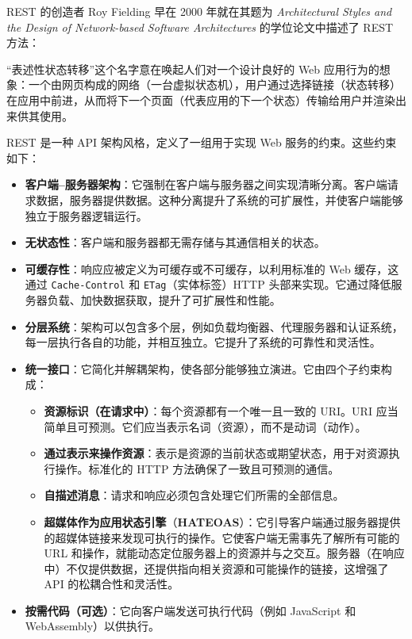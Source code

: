REST 的创造者 Roy Fielding 早在 2000 年就在其题为 \emph{Architectural Styles and the Design of Network-based Software Architectures} 的学位论文中描述了 REST 方法：

\begin{myQuote}
“表述性状态转移”这个名字意在唤起人们对一个设计良好的 Web 应用行为的想象：一个由网页构成的网络（一台虚拟状态机），用户通过选择链接（状态转移）在应用中前进，从而将下一个页面（代表应用的下一个状态）传输给用户并渲染出来供其使用。

\end{myQuote}

REST 是一种 API 架构风格，定义了一组用于实现 Web 服务的约束。这些约束如下：

\begin{itemize}
\label{idx:1624}
\item \textbf{客户端–服务器架构}：它强制在客户端与服务器之间实现清晰分离。客户端请求数据，服务器提供数据。这种分离提升了系统的可扩展性，并使客户端能够独立于服务器逻辑运行。
\item \textbf{无状态性}：客户端和服务器都无需存储与其通信相关的状态。
\item \textbf{可缓存性}：响应应被定义为可缓存或不可缓存，以利用标准的 Web 缓存，这通过 \texttt{Cache-Control} 和 \texttt{ETag}（实体标签）HTTP 头部来实现。它通过降低服务器负载、加快数据获取，提升了可扩展性和性能。
\item \textbf{分层系统}：架构可以包含多个层，例如负载均衡器、代理服务器和认证系统，每一层执行各自的功能，并相互独立。它提升了系统的可靠性和灵活性。
\label{idx:1625}
\item \textbf{统一接口}：它简化并解耦架构，使各部分能够独立演进。它由四个子约束构成：

\begin{itemize}
\item \textbf{资源标识（在请求中）}：每个资源都有一个唯一且一致的 URI。URI 应当简单且可预测。它们应当表示名词（资源），而不是动词（动作）。
\item \textbf{通过表示来操作资源}：表示是资源的当前状态或期望状态，用于对资源执行操作。标准化的 HTTP 方法确保了一致且可预测的通信。
\item \textbf{自描述消息}：请求和响应必须包含处理它们所需的全部信息。
\item \textbf{超媒体作为应用状态引擎}（\textbf{HATEOAS}）：它引导客户端通过服务器提供的超媒体链接来发现可执行的操作。它使客户端无需事先了解所有可能的 URL 和操作，就能动态定位服务器上的资源并与之交互。服务器（在响应中）不仅提供数据，还提供指向相关资源和可能操作的链接，这增强了 API 的松耦合性和灵活性。
\end{itemize}
\item \textbf{按需代码（可选）}：它向客户端发送可执行代码（例如 JavaScript 和 WebAssembly）以供执行。
\end{itemize}

